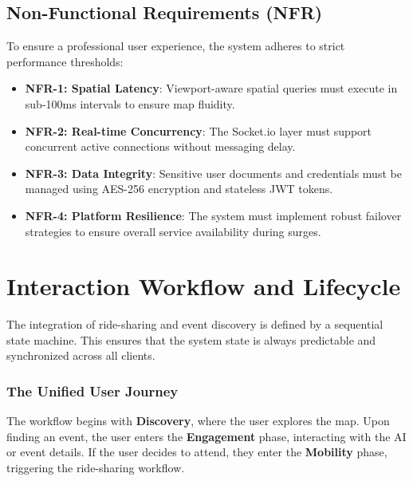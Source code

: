 \subsection{Non-Functional Requirements (NFR)}
To ensure a professional user experience, the system adheres to strict performance thresholds:
\begin{itemize}
    \item \textbf{NFR-1: Spatial Latency}: Viewport-aware spatial queries must execute in sub-100ms intervals to ensure map fluidity.
    \item \textbf{NFR-2: Real-time Concurrency}: The Socket.io layer must support concurrent active connections without messaging delay.
    \item \textbf{NFR-3: Data Integrity}: Sensitive user documents and credentials must be managed using AES-256 encryption and stateless JWT tokens.
    \item \textbf{NFR-4: Platform Resilience}: The system must implement robust failover strategies to ensure overall service availability during surges.
\end{itemize}

\section{Interaction Workflow and Lifecycle}
The integration of ride-sharing and event discovery is defined by a sequential state machine. This ensures that the system state is always predictable and synchronized across all clients.

\subsubsection{The Unified User Journey}
The workflow begins with \textbf{Discovery}, where the user explores the map. Upon finding an event, the user enters the \textbf{Engagement} phase, interacting with the AI or event details. If the user decides to attend, they enter the \textbf{Mobility} phase, triggering the ride-sharing workflow.

